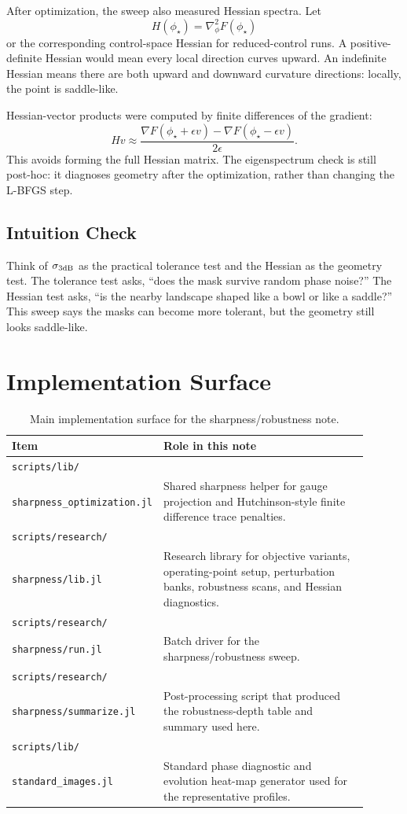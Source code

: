 \documentclass[11pt]{article}
\begin{document}
After optimization, the sweep also measured Hessian spectra. Let
\[
    H(\phi_\star)=\nabla_\phi^2 F(\phi_\star)
\]
or the corresponding control-space Hessian for reduced-control runs. A
positive-definite Hessian would mean every local direction curves upward. An
indefinite Hessian means there are both upward and downward curvature
directions: locally, the point is saddle-like.

Hessian-vector products were computed by finite differences of the gradient:
\[
    Hv
    \approx
    \frac{
    \nabla F(\phi_\star+\epsilon v)
    -
    \nabla F(\phi_\star-\epsilon v)
    }{2\epsilon}.
\]
This avoids forming the full Hessian matrix. The eigenspectrum check is still
post-hoc: it diagnoses geometry after the optimization, rather than changing
the L-BFGS step.

\subsection*{Intuition Check}

Think of \(\sigma_{3\mathrm{dB}}\) as the practical tolerance test and the Hessian as
the geometry test. The tolerance test asks, ``does the mask survive random
phase noise?'' The Hessian test asks, ``is the nearby landscape shaped like a
bowl or like a saddle?'' This sweep says the masks can become more tolerant,
but the geometry still looks saddle-like.

\section{Implementation Surface}

\begin{table}[H]
\centering
\small
\begin{tabular}{p{0.28\linewidth} p{0.62\linewidth}}
\toprule
Item & Role in this note \\
\midrule
\texttt{scripts/lib/}\\
\texttt{sharpness\_optimization.jl} &
Shared sharpness helper for gauge projection and Hutchinson-style finite
difference trace penalties. \\
\texttt{scripts/research/}\\
\texttt{sharpness/lib.jl} &
Research library for objective variants, operating-point setup, perturbation
banks, robustness scans, and Hessian diagnostics. \\
\texttt{scripts/research/}\\
\texttt{sharpness/run.jl} &
Batch driver for the sharpness/robustness sweep. \\
\texttt{scripts/research/}\\
\texttt{sharpness/summarize.jl} &
Post-processing script that produced the robustness-depth table and summary
used here. \\
\texttt{scripts/lib/}\\
\texttt{standard\_images.jl} &
Standard phase diagnostic and evolution heat-map generator used for the
representative profiles. \\
\bottomrule
\end{tabular}
\caption{Main implementation surface for the sharpness/robustness note.}
\end{table}
\end{document}
